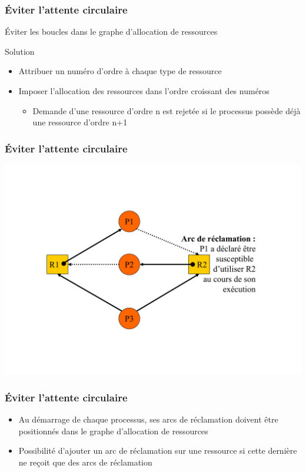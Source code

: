 \begin{frame}
\frametitle{Éviter l’attente circulaire}
Éviter les boucles dans le graphe d’allocation de ressources
\begin{block}{Solution}
\begin{itemize}
\item Attribuer un numéro d’ordre à chaque type de ressource
\item Imposer l’allocation des ressources dans l’ordre croissant des numéros
\begin{itemize}
\item Demande d’une ressource d’ordre n est rejetée si le processus possède déjà une ressource d’ordre n+1
\end{itemize}
\end{itemize}
\end{block}
\end{frame}

\begin{frame}
\frametitle{Éviter l’attente circulaire}
\includegraphics[width=.9\textwidth]{../illustration/arc_reclamation.pdf}
\end{frame}

\begin{frame}
\frametitle{Éviter l’attente circulaire}
\begin{itemize}
\item Au démarrage de chaque processus, ses arcs de réclamation doivent être  positionnés dans le graphe d’allocation de ressources
\item Possibilité d’ajouter un arc de réclamation sur une ressource si cette dernière ne reçoit que des arcs de réclamation
\end{itemize}
\end{frame}

